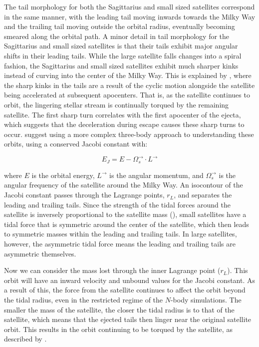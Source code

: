 \documentclass[twocolumn]{article}
\begin{document}
The tail morphology for both the Sagittarius and small sized satellites correspond in the same manner, with the leading tail moving inwards towards the Milky Way and the trailing tail moving outside the orbital radius, eventually becoming smeared along the orbital path. A minor detail in tail morphology for the Sagittarius and small sized satellites is that their tails exhibit major angular shifts in their leading tails. While the large satellite falls changes into a spiral fashion, the Sagittarius and small sized satellites exhibit much sharper kinks instead of curving into the center of the Milky Way. This is explained by \cite{debrisSatellite}, where the sharp kinks in the tails are a result of the cyclic motion alongside the satellite being accelerated at subsequent apocenters. That is, as the satellite continues to orbit, the lingering stellar stream is continually torqued by the remaining satellite. The first sharp turn correlates with the first apocenter of the ejecta, which suggests that the deceleration during escape causes these sharp turns to occur. \cite{binneyTremaine} suggest using a more complex three-body approach to understanding these orbits, using a conserved Jacobi constant with:

\begin{equation}
E_J = E - \Omega^{\rightarrow}_{s}\cdot L^{\rightarrow} 
\label{eq:jacobi}
\end{equation}

where $E$ is the orbital energy, $L^{\rightarrow}$ is the angular momentum, and $\Omega^{\rightarrow}_s$ is the angular frequency of the satellite around the Milky Way. An isocontour of the Jacobi constant passes through the Lagrange points, $r_{L}$, and separates the leading and trailing tails. Since the strength of the tidal forces around the satellite is inversely proportional to the satellite mass (\cite{dynamicsOfTidalTails}), small satellites have a tidal force that is symmetric around the center of the satellite, which then leads to symmetric masses within the leading and trailing tails. In large satellites, however, the asymmetric tidal force means the leading and trailing tails are asymmetric themselves. 

Now we can consider the mass lost through the inner Lagrange point ($r_L$). This orbit will have an inward velocity and unbound values for the Jacobi constant. As a result of this, the force from the satellite continues to affect the orbit beyond the tidal radius, even in the restricted regime of the $N$-body simulations. The smaller the mass of the satellite, the closer the tidal radius is to that of the satellite, which means that the ejected tails then linger near the original satellite orbit. This results in the orbit continuing to be torqued by the satellite, as described by \cite{dynamicsOfTidalTails}.
\end{document}
